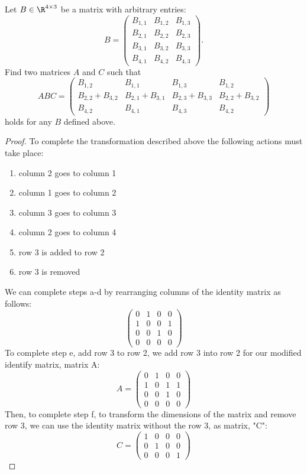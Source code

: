 \documentclass[11pt,nocut]{article}
\begin{document}
\begin{problem}[2 points]
	Let $B \in \R^{4 \times 3}$ be a matrix with arbitrary entries:
	$$
	B = 
	\begin{pmatrix}
		B_{1,1} & B_{1,2} & B_{1,3}\\
		B_{2,1} & B_{2,2} & B_{2,3}\\
		B_{3,1} & B_{3,2} & B_{3,3}\\
		B_{4,1} & B_{4,2} & B_{4,3}
	\end{pmatrix}.
	$$
	Find two matrices $A$ and $C$ such that
	$$
	A B C = 
	\begin{pmatrix}
		B_{1,2} & B_{1,1} & B_{1,3} & B_{1,2} \\
		B_{2,2} + B_{3,2} & B_{2,1} + B_{3,1} & B_{2,3} + B_{3,3} & B_{2,2} + B_{3,2} \\
		B_{4,2} & B_{4,1} & B_{4,3} & B_{4,2}
	\end{pmatrix}
	$$
	holds for any $B$ defined above.
\end{problem}
\begin{proof}
	To complete the transformation described above the following actions must take place:
	\begin{enumerate}[label=\normalfont(\textbf{\alph*})]
	\item column 2 goes to column 1
	\item column 1 goes to column 2
	\item column 3 goes to column 3
	\item column 2 goes to column 4
	\item row 3 is added to row 2
	\item row 3 is removed
	\end{enumerate}
	We can complete steps a-d by rearranging columns of the identity matrix as follows:
	$$
		\begin{pmatrix}
		0 & 1 & 0 & 0 \\
		1 & 0 & 0 & 1 \\
		0 & 0 & 1 & 0 \\
		0 & 0 & 0 & 0
		\end{pmatrix}
	$$
	To complete step e, add row 3 to row 2, we add row 3 into row 2 for our modified identify matrix, matrix A:
	$$ A = 
		\begin{pmatrix}
		0 & 1 & 0 & 0 \\
		1 & 0 & 1 & 1 \\
		0 & 0 & 1 & 0 \\
		0 & 0 & 0 & 0
		\end{pmatrix}
	$$
	Then, to complete step f, to transform the dimensions of the matrix and remove row 3,  we can use the identity matrix without the row 3, as matrix, "C":
	$$ C = 
		\begin{pmatrix}
		1 & 0 & 0 & 0 \\
		0 & 1 & 0 & 0 \\
		0 & 0 & 0 & 1
		\end{pmatrix}
	$$
\end{proof}
\end{document}
